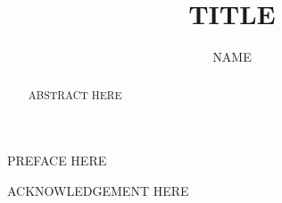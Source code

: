 \documentclass[12pt]{report}
\begin{document}
	
	
	
	

	\frontpiece{
		{\large 
		}
	}%
	
	\dedication{\large .....}%
	
	\title{TITLE}
	\author{NAME}%
	
	
	\doublespacing	
	\begin{abstract}
ABSTRACT HERE

	\end{abstract}%

\begin{preface}
PREFACE HERE


\end{preface}

\begin{acknowledgements}

ACKNOWLEDGEMENT HERE

\end{acknowledgements}
	
	
	
\end{document}
